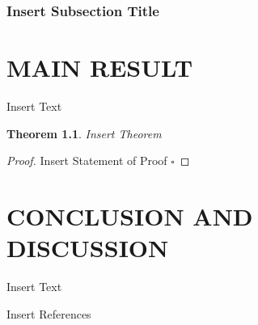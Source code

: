 \documentclass[12pt,a4paper,oneside]{book}
\theoremstyle{plain}
\newtheorem{thm}{Theorem}[chapter]
\numberwithin{equation}{chapter}
\newcommand*{\QEDAa}{\hfill\ensuremath{\square}}
\begin{document}
\subsection{Insert Subsection Title}\label{sub3.2.2}

\chapter{MAIN RESULT}

Insert Text
 
 \begin{thm}\label{thmx}
 	Insert Theorem
 \end{thm}
 
 \noindent\begin{proof}
 	Insert Statement of Proof
 	\QEDAa
 \end{proof}

\chapter{CONCLUSION AND DISCUSSION}
Insert Text



\begin{thebibliography}{99}

Insert References
\end{thebibliography}
\end{document}
